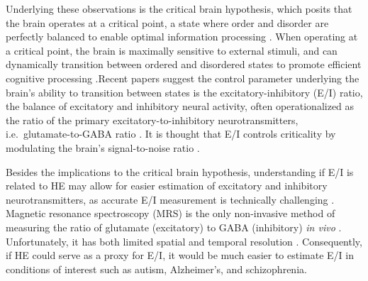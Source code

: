 \documentclass[
true
]{sn-jnl}
\begin{document}
Underlying these observations is the critical brain hypothesis, which
posits that the brain operates at a critical point, a state where order
and disorder are perfectly balanced to enable optimal information
processing
\citep{decoRestingBrainsNever2013, beggsBeingCriticalCriticality2012, barangerChaosComplexityEntropy2000, bassettUnderstandingComplexityHuman2011, zimmernWhyBrainCriticality2020, liangExcitationInhibitionBalance2024, poilCriticalStateDynamicsAvalanches2012, lombardiBalanceExcitationInhibition2017, baumgartenCriticalExcitationinhibitionBalance2019, bruiningMeasurementExcitationinhibitionRatio2020, trakoshisIntrinsicExcitationinhibitionImbalance, gaoInferringSynapticExcitation2017, tianTheoreticalFoundationsStudying2022, rubinovNeurobiologicallyRealisticDeterminants2011}.
When operating at a critical point, the brain is maximally sensitive to
external stimuli, and can dynamically transition between ordered and
disordered states to promote efficient cognitive processing
\citep{decoRestingBrainsNever2013, beggsBeingCriticalCriticality2012, tianTheoreticalFoundationsStudying2022, rubinovNeurobiologicallyRealisticDeterminants2011}.Recent
papers suggest the control parameter underlying the brain's ability to
transition between states is the excitatory-inhibitory (E/I) ratio, the
balance of excitatory and inhibitory neural activity, often
operationalized as the ratio of the primary excitatory-to-inhibitory
neurotransmitters, i.e.~glutamate-to-GABA ratio
\citep{liangExcitationInhibitionBalance2024, lombardiBalanceExcitationInhibition2017, baumgartenCriticalExcitationinhibitionBalance2019, bruiningMeasurementExcitationinhibitionRatio2020, trakoshisIntrinsicExcitationinhibitionImbalance, gaoInferringSynapticExcitation2017}.
It is thought that E/I controls criticality by modulating the brain's
signal-to-noise ratio
\citep{liangExcitationInhibitionBalance2024, rubensteinModelAutismIncreased2003}.

Besides the implications to the critical brain hypothesis, understanding
if E/I is related to HE may allow for easier estimation of excitatory
and inhibitory neurotransmitters, as accurate E/I measurement is
technically challenging \citep{ajramContribution1HMagnetic2019}.
Magnetic resonance spectroscopy (MRS) is the only non-invasive method of
measuring the ratio of glutamate (excitatory) to GABA (inhibitory)
\emph{in vivo} \citep{stanleyFunctionalMagneticResonance2018}.
Unfortunately, it has both limited spatial and temporal resolution
\citep{gaoInferringSynapticExcitation2017, ajramContribution1HMagnetic2019, stanleyFunctionalMagneticResonance2018}.
Consequently, if HE could serve as a proxy for E/I, it would be much
easier to estimate E/I in conditions of interest such as autism,
Alzheimer's, and schizophrenia.
\end{document}
